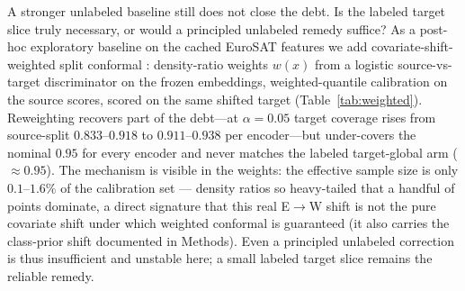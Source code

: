 \documentclass[journal]{IEEEtran}
\renewcommand{\_}{\textunderscore\allowbreak}
\begin{document}
A stronger unlabeled baseline still does not close the debt. Is the labeled target slice truly
necessary, or would a principled unlabeled remedy suffice? As a post-hoc exploratory baseline on the
cached EuroSAT features we add covariate-shift-weighted split conformal \citep{tibshirani2019covariate}:
density-ratio weights $w(x)$ from a logistic source-vs-target discriminator on the frozen embeddings,
weighted-quantile calibration on the source scores, scored on the same shifted target
(Table~\ref{tab:weighted}). Reweighting recovers part of the debt---at $\alpha=0.05$ target coverage
rises from source-split $0.833$--$0.918$ to $0.911$--$0.938$ per encoder---but under-covers the
nominal $0.95$ for every encoder and never matches the labeled target-global arm (${\approx}0.95$).
The mechanism is visible in the weights: the effective sample size is only $0.1$--$1.6\%$ of the
calibration set --- density ratios so heavy-tailed that a handful of points dominate, a direct
signature that this real E$\to$W shift is not the pure covariate shift under which weighted conformal
is guaranteed (it also carries the class-prior shift documented in Methods). Even a principled
unlabeled correction is thus insufficient and unstable here; a small labeled target slice remains the
reliable remedy.
\end{document}
